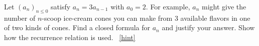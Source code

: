\documentclass{book}
\begin{document}
\setcounter{project}{144}
\addtocounter{project}{-1}
\begin{activity}[]\label{act-geometric}
\hypertarget{p-977}{}%
Let \((a_n)_{n \le 0}\) satisfy \(a_n = 3a_{n-1}\) with \(a_0 = 2\).  For example, \(a_n\) might give the number of \(n\)-scoop ice-cream cones you can make from 3 available flavors in one of two kinds of cones.  Find a closed formula for \(a_n\) and justify your answer.  Show how the recurrence relation is used.%
~\hfill{\tiny\hyperlink{a-144}{[hint]}\hypertarget{q-144}{}}\end{activity}
\end{document}
